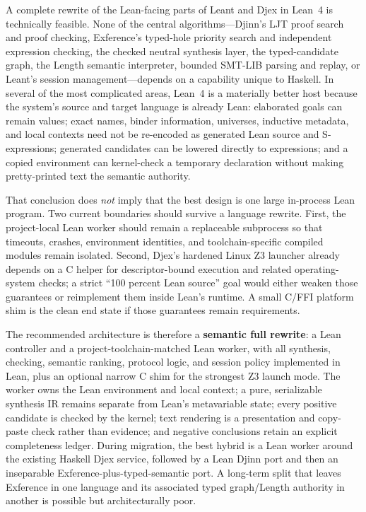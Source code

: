 \documentclass[10pt,letterpaper,oneside]{report}
\newcommand{\code}[1]{\texttt{\detokenize{#1}}}
\newcommand{\Lean}{Lean~4}
\newcommand{\Haskell}{Haskell}
\newcommand{\term}[1]{\textbf{#1}}
\begin{document}
A complete rewrite of the Lean-facing parts of Leant and Djex in \Lean{} is technically feasible. None of the central algorithms---Djinn's LJT proof search and proof checking, Exference's typed-hole priority search and independent expression checking, the checked neutral synthesis layer, the typed-candidate graph, the Length semantic interpreter, bounded SMT-LIB parsing and replay, or Leant's session management---depends on a capability unique to \Haskell{}. In several of the most complicated areas, \Lean{} is a materially better host because the system's source and target language is already Lean: elaborated goals can remain \code{Expr} values; exact names, binder information, universes, inductive metadata, and local contexts need not be re-encoded as generated Lean source and S-expressions; generated candidates can be lowered directly to expressions; and a copied environment can kernel-check a temporary declaration without making pretty-printed text the semantic authority.

That conclusion does \emph{not} imply that the best design is one large in-process Lean program. Two current boundaries should survive a language rewrite. First, the project-local Lean worker should remain a replaceable subprocess so that timeouts, crashes, environment identities, and toolchain-specific compiled modules remain isolated. Second, Djex's hardened Linux Z3 launcher already depends on a C helper for descriptor-bound execution and related operating-system checks; a strict ``100 percent Lean source'' goal would either weaken those guarantees or reimplement them inside Lean's runtime. A small C/FFI platform shim is the clean end state if those guarantees remain requirements.

The recommended architecture is therefore a \term{semantic full rewrite}: a Lean controller and a project-toolchain-matched Lean worker, with all synthesis, checking, semantic ranking, protocol logic, and session policy implemented in Lean, plus an optional narrow C shim for the strongest Z3 launch mode. The worker owns the Lean environment and local context; a pure, serializable synthesis IR remains separate from Lean's metavariable state; every positive candidate is checked by the kernel; text rendering is a presentation and copy-paste check rather than evidence; and negative conclusions retain an explicit completeness ledger. During migration, the best hybrid is a Lean worker around the existing Haskell Djex service, followed by a Lean Djinn port and then an inseparable Exference-plus-typed-semantic port. A long-term split that leaves Exference in one language and its associated typed graph/Length authority in another is possible but architecturally poor.
\end{document}
